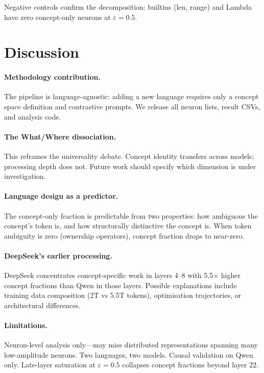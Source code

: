 \documentclass[11pt]{article}
\begin{document}
Negative controls confirm the decomposition: builtins (len, range) and Lambda have zero concept-only neurons at $\varepsilon = 0.5$.

\section{Discussion}

\paragraph{Methodology contribution.} The pipeline is language-agnostic: adding a new language requires only a concept space definition and contrastive prompts. We release all neuron lists, result CSVs, and analysis code.

\paragraph{The What/Where dissociation.} This reframes the universality debate. Concept identity transfers across models; processing depth does not. Future work should specify which dimension is under investigation.

\paragraph{Language design as a predictor.} The concept-only fraction is predictable from two properties: how ambiguous the concept's token is, and how structurally distinctive the concept is. When token ambiguity is zero (ownership operators), concept fraction drops to near-zero.

\paragraph{DeepSeek's earlier processing.} DeepSeek concentrates concept-specific work in layers 4--8 with 5.5$\times$ higher concept fractions than Qwen in those layers. Possible explanations include training data composition (2T vs 5.5T tokens), optimisation trajectories, or architectural differences.

\paragraph{Limitations.} Neuron-level analysis only---may miss distributed representations spanning many low-amplitude neurons. Two languages, two models. Causal validation on Qwen only. Late-layer saturation at $\varepsilon = 0.5$ collapses concept fractions beyond layer 22.
\end{document}
